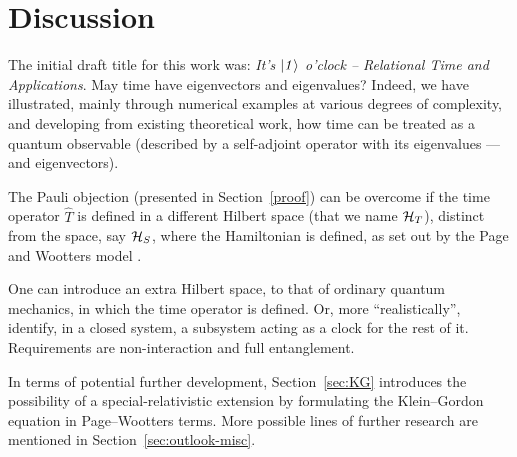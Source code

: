 \section{Discussion}

The initial draft title for this work was: 
\textit{It's $\it\ket{1}$ o'clock -- Relational Time and Applications}.
May time have eigenvectors and eigenvalues?
Indeed,
we have illustrated,
mainly through numerical examples
at various degrees of complexity,
and developing from existing theoretical work,
how time can be treated as a quantum observable
(described by a self-adjoint operator with its eigenvalues ---and eigenvectors).

The Pauli objection (presented in Section~\ref{proof})
can be overcome if the time operator $\hat{T}$
is defined in a different Hilbert space (that we name $\mathcal{H}_T$),
distinct from
the space, say $\mathcal{H}_S$, where the Hamiltonian is defined,
as set out by the Page and Wootters model
\parencite{PageWootters, Lloyd:Time, Marletto:Evolution, Maccone:QMOT, Maccone:Pauli}.

One can introduce an extra Hilbert space, to that of ordinary quantum mechanics,
in which the time operator is defined.
Or, more ``realistically'', identify, in a closed system, a subsystem
acting as a clock for the rest of it. Requirements are non-interaction and
full entanglement.

In terms of potential further development,
Section~\ref{sec:KG} introduces the possibility of a special-relativistic extension
by formulating the Klein--Gordon equation in Page--Wootters terms.
More possible lines of further research are mentioned in Section~\ref{sec:outlook-misc}.



